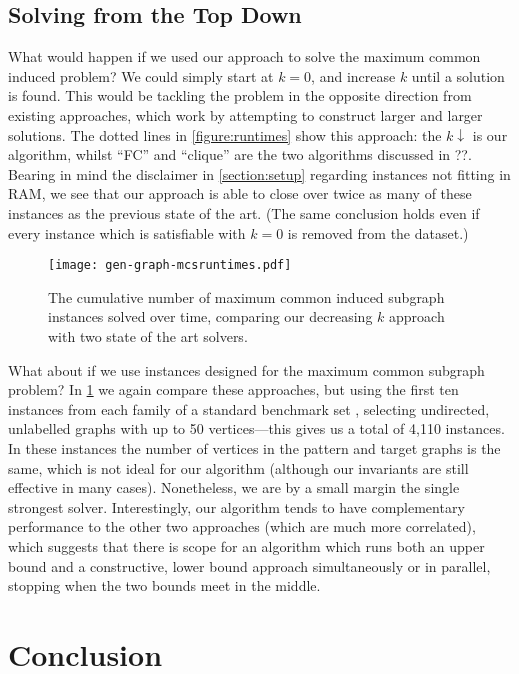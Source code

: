 \documentclass[letterpaper]{article}
\newcommand{\citep}[1]{\cite{#1}}
\theoremstyle{definition}
\begin{document}
\subsection{Solving from the Top Down}

What would happen if we used our approach to solve the maximum common induced problem? We could
simply start at $k = 0$, and increase $k$ until a solution is found. This would be tackling the
problem in the opposite direction from existing approaches, which work by attempting to construct
larger and larger solutions. The dotted lines in \cref{figure:runtimes} show this approach: the $k
\downarrow$ is our algorithm, whilst ``FC'' and ``clique'' are the two algorithms discussed in ??.
Bearing in mind the disclaimer in \cref{section:setup} regarding instances not fitting in RAM, we
see that our approach is able to close over twice as many of these instances as the previous state
of the art. (The same conclusion holds even if every instance which is satisfiable with $k = 0$ is
removed from the dataset.)

\begin{figure}[tb]
    \texttt{[image: gen-graph-mcsruntimes.pdf]}
    \caption{The cumulative number of maximum common induced subgraph instances solved over time,
    comparing our decreasing $k$ approach with two state of the art
    solvers.}\label{figure:mcsruntimes}
\end{figure}

What about if we use instances designed for the maximum common subgraph problem? In
\cref{figure:mcsruntimes} we again compare these approaches, but using the first ten instances from
each family of a standard benchmark set
\citep{DBLP:journals/prl/SantoFSV03,DBLP:journals/jgaa/ConteFV07}, selecting undirected, unlabelled
graphs with up to 50 vertices---this gives us a total of 4,110 instances. In these instances the
number of vertices in the pattern and target graphs is the same, which is not ideal for our
algorithm (although our invariants are still effective in many cases). Nonetheless, we are by a
small margin the single strongest solver. Interestingly, our algorithm tends to have complementary
performance to the other two approaches (which are much more correlated), which suggests that there
is scope for an algorithm which runs both an upper bound and a constructive, lower bound approach
simultaneously or in parallel, stopping when the two bounds meet in the middle.

\section{Conclusion}
\end{document}
